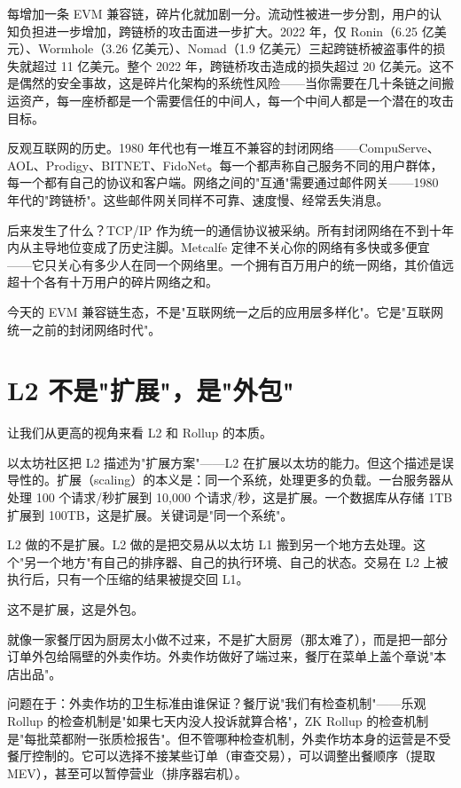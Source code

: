 \documentclass[a4paper,12pt,openany]{ctexbook}
\begin{document}
每增加一条 EVM 兼容链，碎片化就加剧一分。流动性被进一步分割，用户的认知负担进一步增加，跨链桥的攻击面进一步扩大。2022 年，仅 Ronin（6.25 亿美元）、Wormhole（3.26 亿美元）、Nomad（1.9 亿美元）三起跨链桥被盗事件的损失就超过 11 亿美元。整个 2022 年，跨链桥攻击造成的损失超过 20 亿美元。这不是偶然的安全事故，这是碎片化架构的系统性风险——当你需要在几十条链之间搬运资产，每一座桥都是一个需要信任的中间人，每一个中间人都是一个潜在的攻击目标。

反观互联网的历史。1980 年代也有一堆互不兼容的封闭网络——CompuServe、AOL、Prodigy、BITNET、FidoNet。每一个都声称自己服务不同的用户群体，每一个都有自己的协议和客户端。网络之间的"互通"需要通过邮件网关——1980 年代的"跨链桥"。这些邮件网关同样不可靠、速度慢、经常丢失消息。

后来发生了什么？TCP/IP 作为统一的通信协议被采纳。所有封闭网络在不到十年内从主导地位变成了历史注脚。Metcalfe 定律不关心你的网络有多快或多便宜——它只关心有多少人在同一个网络里。一个拥有百万用户的统一网络，其价值远超十个各有十万用户的碎片网络之和。

今天的 EVM 兼容链生态，不是"互联网统一之后的应用层多样化"。它是"互联网统一之前的封闭网络时代"。


\section*{L2 不是"扩展"，是"外包"}


让我们从更高的视角来看 L2 和 Rollup 的本质。

以太坊社区把 L2 描述为"扩展方案"——L2 在扩展以太坊的能力。但这个描述是误导性的。扩展（scaling）的本义是：同一个系统，处理更多的负载。一台服务器从处理 100 个请求/秒扩展到 10,000 个请求/秒，这是扩展。一个数据库从存储 1TB 扩展到 100TB，这是扩展。关键词是"同一个系统"。

L2 做的不是扩展。L2 做的是把交易从以太坊 L1 搬到另一个地方去处理。这个"另一个地方"有自己的排序器、自己的执行环境、自己的状态。交易在 L2 上被执行后，只有一个压缩的结果被提交回 L1。

这不是扩展，这是外包。

就像一家餐厅因为厨房太小做不过来，不是扩大厨房（那太难了），而是把一部分订单外包给隔壁的外卖作坊。外卖作坊做好了端过来，餐厅在菜单上盖个章说"本店出品"。

问题在于：外卖作坊的卫生标准由谁保证？餐厅说"我们有检查机制"——乐观 Rollup 的检查机制是"如果七天内没人投诉就算合格"，ZK Rollup 的检查机制是"每批菜都附一张质检报告"。但不管哪种检查机制，外卖作坊本身的运营是不受餐厅控制的。它可以选择不接某些订单（审查交易），可以调整出餐顺序（提取 MEV），甚至可以暂停营业（排序器宕机）。
\end{document}
